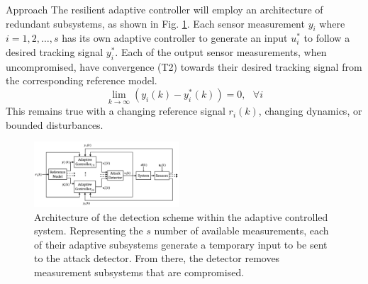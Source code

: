 \begin{section}{Approach}
The resilient adaptive controller will employ  an architecture of redundant subsystems, as shown in Fig. \ref{fig:det_arch}. Each sensor measurement $y_i$ where $i=1,2,\dots,s$ has its own adaptive controller to generate an input $u^*_i$ to follow a desired tracking signal $y^*_i$. Each of the output sensor measurements, when uncompromised, have convergence (T2) towards their desired tracking signal from the corresponding reference model. 
    \begin{equation}
    \label{multiple_output_tracking}
    \lim_{k\to\infty}(y_i(k)-y^*_i(k))=0, \text{ }\forall i
    \end{equation}
This remains true with a changing reference signal $r_i(k)$, changing dynamics, or bounded disturbances. 

\begin{figure}[ht!]
\vspace{1pt}
\centering
\includegraphics[width=0.48\textwidth]{con_and_det.png}
\caption{Architecture of the detection scheme within the adaptive controlled system. Representing  the $s$ number of available measurements, each of their adaptive subsystems generate a temporary input to be sent to the attack detector. From there, the detector removes measurement subsystems that are compromised.}
\label{fig:det_arch}
\end{figure}


\end{section}
